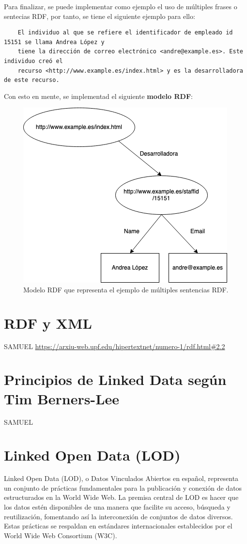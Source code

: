 \documentclass[11pt]{report}
\begin{document}
Para finalizar, se puede implementar como ejemplo el uso de múltiples frases o sentecias RDF, por tanto, se tiene el siguiente ejemplo para ello:

\begin{verbatim}
	El individuo al que se refiere el identificador de empleado id 15151 se llama Andrea López y 
	tiene la dirección de correo electrónico <andre@example.es>. Este individuo creó el 
	recurso <http://www.example.es/index.html> y es la desarrolladora de este recurso.
\end{verbatim}

Con esto en mente, se implementad el siguiente \textbf{modelo RDF}:

\begin{figure}[H]
	\centering
	\includegraphics[scale=0.7]{../img/Modelo-RDF.png}
	\caption{Modelo RDF que representa el ejemplo de múltiples sentencias RDF.}
	\label{fig:Modelo-RDF}
\end{figure}

	\chapter{RDF y XML}
	SAMUEL
	\url{https://arxiu-web.upf.edu/hipertextnet/numero-1/rdf.html#2.2}

	\chapter{Principios de Linked Data según Tim Berners-Lee}
	SAMUEL

	\chapter{Linked Open Data (LOD)}
		Linked Open Data (LOD), o Datos Vinculados Abiertos en español, representa un conjunto de prácticas fundamentales para la publicación y conexión de datos estructurados en la World Wide Web. La premisa central de LOD es hacer que los datos estén disponibles de una manera que facilite su acceso, búsqueda y reutilización, fomentando así la interconexión de conjuntos de datos diversos. Estas prácticas se respaldan en estándares internacionales establecidos por el World Wide Web Consortium (W3C).
\end{document}
